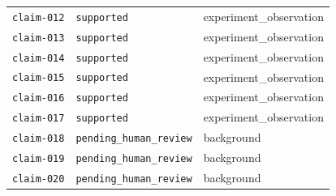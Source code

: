 \documentclass[UTF8]{ctexart}
\begin{document}
\begin{longtable}{@{}>{\raggedright\arraybackslash}p{}>{\raggedright\arraybackslash}p{}>{\raggedright\arraybackslash}p{}@{}}
\texttt{\scriptsize claim-\allowbreak{}012} & \texttt{\scriptsize supported} & experiment\_\allowbreak{}observation \\
\texttt{\scriptsize claim-\allowbreak{}013} & \texttt{\scriptsize supported} & experiment\_\allowbreak{}observation \\
\texttt{\scriptsize claim-\allowbreak{}014} & \texttt{\scriptsize supported} & experiment\_\allowbreak{}observation \\
\texttt{\scriptsize claim-\allowbreak{}015} & \texttt{\scriptsize supported} & experiment\_\allowbreak{}observation \\
\texttt{\scriptsize claim-\allowbreak{}016} & \texttt{\scriptsize supported} & experiment\_\allowbreak{}observation \\
\texttt{\scriptsize claim-\allowbreak{}017} & \texttt{\scriptsize supported} & experiment\_\allowbreak{}observation \\
\texttt{\scriptsize claim-\allowbreak{}018} & \texttt{\scriptsize pending\_\allowbreak{}human\_\allowbreak{}review} & background \\
\texttt{\scriptsize claim-\allowbreak{}019} & \texttt{\scriptsize pending\_\allowbreak{}human\_\allowbreak{}review} & background \\
\texttt{\scriptsize claim-\allowbreak{}020} & \texttt{\scriptsize pending\_\allowbreak{}human\_\allowbreak{}review} & background \\
\bottomrule
\end{longtable}
\end{document}
